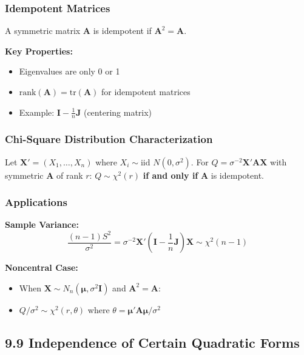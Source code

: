 \subsubsection{Idempotent Matrices}

\begin{definition}
A symmetric matrix $\mathbf{A}$ is idempotent if $\mathbf{A}^2 = \mathbf{A}$.
\end{definition}
\textbf{Key Properties:}

\begin{itemize}
	\item Eigenvalues are only 0 or 1
	\item $\text{rank}(\mathbf{A}) = \text{tr}(\mathbf{A})$ for idempotent matrices
	\item Example: $\mathbf{I} - \frac{1}{n}\mathbf{J}$ (centering matrix)
\end{itemize}

\subsubsection{Chi-Square Distribution Characterization}

\begin{theorem}
Let $\mathbf{X}' = (X_1, \ldots, X_n)$ where $X_i \sim \text{iid } N(0, \sigma^2)$. For $Q = \sigma^{-2}\mathbf{X}'\mathbf{A}\mathbf{X}$ with symmetric $\mathbf{A}$ of rank $r$:
$Q \sim \chi^2(r)$ \textbf{if and only if} $\mathbf{A}$ is idempotent.
\end{theorem}
\subsubsection{Applications}

\textbf{Sample Variance:}
\[
\frac{(n-1)S^2}{\sigma^2} = \sigma^{-2}\mathbf{X}'(\mathbf{I} - \frac{1}{n}\mathbf{J})\mathbf{X} \sim \chi^2(n-1)
\]

\textbf{Noncentral Case:}

\begin{itemize}
	\item When $\mathbf{X} \sim N_n(\boldsymbol{\mu}, \sigma^2\mathbf{I})$ and $\mathbf{A}^2 = \mathbf{A}$:
	\item $Q/\sigma^2 \sim \chi^2(r, \theta)$ where $\theta = \boldsymbol{\mu}'\mathbf{A}\boldsymbol{\mu}/\sigma^2$
\end{itemize}

\subsection{9.9 Independence of Certain Quadratic Forms}

